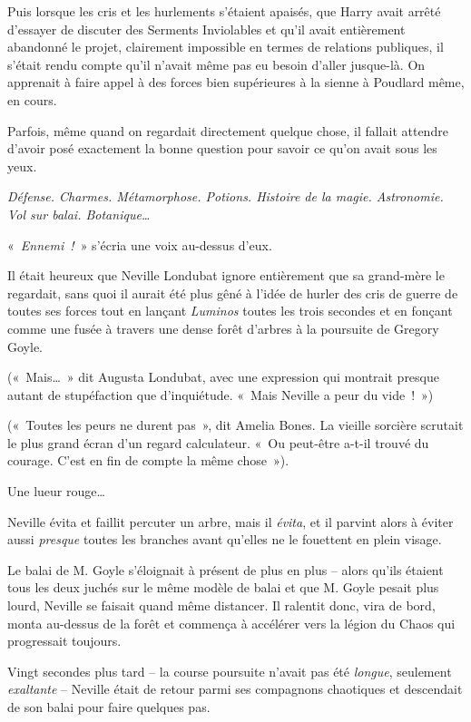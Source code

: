 Puis lorsque les cris et les hurlements s'étaient apaisés, que Harry avait arrêté d'essayer de discuter des Serments Inviolables et qu'il avait entièrement abandonné le projet, clairement impossible en termes de relations publiques, il s'était rendu compte qu'il n'avait même pas eu besoin d'aller jusque-là. On apprenait à faire appel à des forces bien supérieures à la sienne à Poudlard même, en cours.

Parfois, même quand on regardait directement quelque chose, il fallait attendre d'avoir posé exactement la bonne question pour savoir ce qu'on avait sous les yeux.

\emph{Défense. Charmes. Métamorphose. Potions. Histoire de la magie. Astronomie. Vol sur balai. Botanique…}

«~\emph{Ennemi~!}~» s'écria une voix au-dessus d'eux.

\later

Il était heureux que Neville Londubat ignore entièrement que sa grand-mère le regardait, sans quoi il aurait été plus gêné à l'idée de hurler des cris de guerre de toutes ses forces tout en lançant \emph{Luminos} toutes les trois secondes et en fonçant comme une fusée à travers une dense forêt d'arbres à la poursuite de Gregory Goyle.

(«~Mais…~» dit Augusta Londubat, avec une expression qui montrait presque autant de stupéfaction que d'inquiétude. «~Mais Neville a peur du vide~!~»)

(«~Toutes les peurs ne durent pas~», dit Amelia Bones. La vieille sorcière scrutait le plus grand écran d'un regard calculateur. «~Ou peut-être a-t-il trouvé du courage. C'est en fin de compte la même chose~»).

Une lueur rouge…

Neville évita et faillit percuter un arbre, mais il \emph{évita}, et il parvint alors à éviter aussi \emph{presque} toutes les branches avant qu'elles ne le fouettent en plein visage.

Le balai de M. Goyle s'éloignait à présent de plus en plus -- alors qu'ils étaient tous les deux juchés sur le même modèle de balai et que M. Goyle pesait plus lourd, Neville se faisait quand même distancer. Il ralentit donc, vira de bord, monta au-dessus de la forêt et commença à accélérer vers la légion du Chaos qui progressait toujours.

Vingt secondes plus tard -- la course poursuite n'avait pas été \emph{longue}, seulement \emph{exaltante} -- Neville était de retour parmi ses compagnons chaotiques et descendait de son balai pour faire quelques pas.

